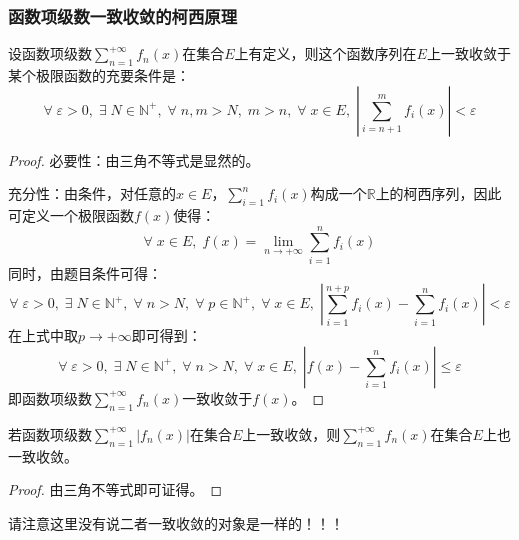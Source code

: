 \subsubsection{函数项级数一致收敛的柯西原理}
\begin{theorem}
	设函数项级数$\sum\limits_{n=1}^{+\infty}f_n(x)$在集合$E$上有定义，则这个函数序列在$E$上一致收敛于某个极限函数的充要条件是：
	\begin{equation*}
		\forall\;\varepsilon>0,\;\exists\;N\in\mathbb{N}^+,\;\forall\;n,m>N,\;m>n,\;\forall\;x\in E,\;\left|\sum_{i=n+1}^mf_i(x)\right|<\varepsilon
	\end{equation*}
\end{theorem}
\begin{proof}
	必要性：由三角不等式是显然的。\par
	充分性：由条件，对任意的$x\in E$，$\sum\limits_{i=1}^nf_i(x)$构成一个$\mathbb{R}$上的柯西序列，因此可定义一个极限函数$f(x)$使得：
	\begin{equation*}
		\forall\;x\in E,\;f(x)=\lim_{n\to+\infty}\sum_{i=1}^nf_i(x)
	\end{equation*}
	同时，由题目条件可得：
	\begin{equation*}
		\forall\;\varepsilon>0,\;\exists\;N\in\mathbb{N}^+,\;\forall\;n>N,\;\forall\;p\in\mathbb{N}^+,\;\forall\;x\in E,\;\left|\sum_{i=1}^{n+p}f_i(x)-\sum_{i=1}^{n}f_i(x)\right|<\varepsilon
	\end{equation*}
	在上式中取$p\to+\infty$即可得到：
	\begin{equation*}
		\forall\;\varepsilon>0,\;\exists\;N\in\mathbb{N}^+,\;\forall\;n>N,\;\forall\;x\in E,\;|f(x)-\sum_{i=1}^nf_i(x)|\leqslant\varepsilon
	\end{equation*}
	即函数项级数$\sum\limits_{n=1}^{+\infty}f_n(x)$一致收敛于$f(x)$。
\end{proof}
\begin{corollary}
	若函数项级数$\sum\limits_{n=1}^{+\infty}|f_n(x)|$在集合$E$上一致收敛，则$\sum\limits_{n=1}^{+\infty}f_n(x)$在集合$E$上也一致收敛。
\end{corollary}
\begin{proof}
	由三角不等式即可证得。
\end{proof}
请注意这里没有说二者一致收敛的对象是一样的！！！
